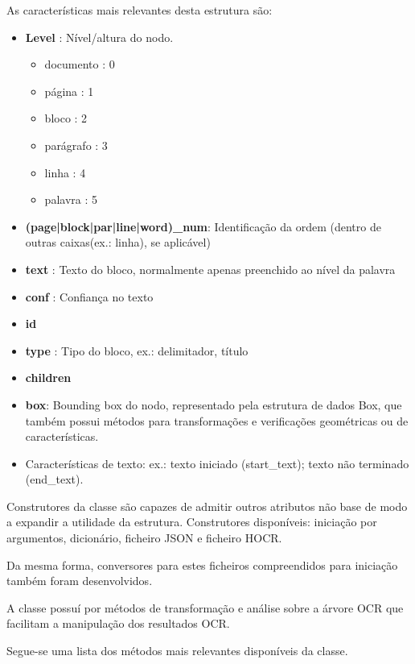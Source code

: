 As características mais relevantes desta estrutura são:

\begin{itemize}\setlength\itemsep{-0.3em}
	\item \textbf{Level} : Nível/altura do nodo.
	\begin{itemize}\setlength\itemsep{-0.3em}
		\item documento : 0
		\item página 	: 1
		\item bloco		: 2
		\item parágrafo : 3
		\item linha 	: 4
		\item palavra	: 5
	\end{itemize}\setlength\itemsep{-0.3em}
	\item \textbf{(page|block|par|line|word)\_num}: Identificação da ordem (dentro de outras caixas(ex.: linha), se aplicável)
	\item \textbf{text} : Texto do bloco, normalmente apenas preenchido ao nível da palavra
	\item \textbf{conf} : Confiança no texto
	\item \textbf{id}
	\item \textbf{type} : Tipo do bloco, ex.: delimitador, título
	\item \textbf{children}
	\item \textbf{box}: Bounding box do nodo, representado pela estrutura de dados Box, que também possui métodos para transformações e verificações geométricas ou de características.
	\item Características de texto: ex.: texto iniciado (start\_text); texto não terminado (end\_text).
\end{itemize}


Construtores da classe são capazes de admitir outros atributos não base de modo a expandir a utilidade da estrutura. Construtores disponíveis: iniciação por argumentos, dicionário, ficheiro JSON e ficheiro HOCR.

Da mesma forma, conversores para estes ficheiros compreendidos para iniciação também foram desenvolvidos.

A classe possuí por métodos de transformação e análise sobre a árvore OCR que facilitam a manipulação dos resultados OCR. 

Segue-se uma lista dos métodos mais relevantes disponíveis da classe.

